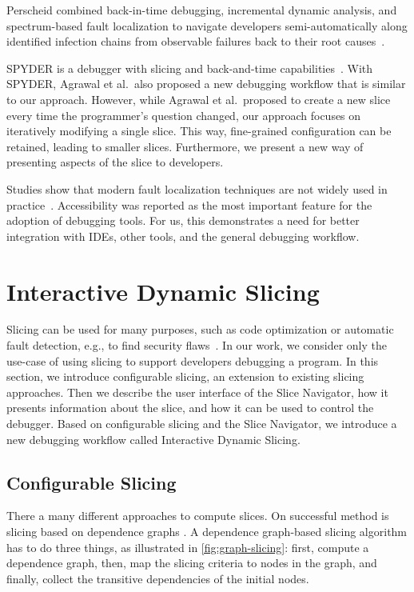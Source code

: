 \documentclass[
			english,
			]{elsarticle}
\begin{document}
Perscheid combined back-in-time debugging, incremental dynamic analysis, and spectrum-based fault localization to navigate developers semi-automatically along identified infection chains from observable failures back to their root causes~\cite{perscheid_testdriven_2013}.

SPYDER is a debugger with slicing and back-and-time capabilities~\cite{agrawal_debugging_1993}.
With SPYDER, Agrawal et al.\ also proposed a new debugging workflow that is similar to our approach.
However, while Agrawal et al.\ proposed to create a new slice every time the programmer's question changed, our approach focuses on iteratively modifying a single slice.
This way, fine-grained configuration can be retained, leading to smaller slices.
Furthermore, we present a new way of presenting aspects of the slice to developers.

Studies show that modern fault localization techniques are not widely used in practice~\cite{perscheid_studying_2017}.
Accessibility was reported as the most important feature for the adoption of debugging tools.
For us, this demonstrates a need for better integration with IDEs, other tools, and the general debugging workflow.

\section{Interactive Dynamic Slicing}
\label{sec:workflow}

Slicing can be used for many purposes, such as code optimization or automatic fault detection, e.g., to find security flaws~\cite{Ottenstein:1984:PDG:390011.808263, Backes:2016:RLA:2897845.2897927}.
In our work, we consider only the use-case of using slicing to support developers debugging a program.
In this section, we introduce configurable slicing, an extension to existing slicing approaches. 
Then we describe the user interface of the Slice Navigator, how it presents information about the slice, and how it can be used to control the debugger.
Based on configurable slicing and the Slice Navigator, we introduce a new debugging workflow called Interactive Dynamic Slicing.

\subsection{Configurable Slicing}

There a many different approaches to compute slices.
On successful method is slicing based on dependence graphs \cite{korel_dynamic_1998}.
A dependence graph-based slicing algorithm has to do three things, as illustrated in \cref{fig:graph-slicing}:
first, compute a dependence graph, then, map the slicing criteria to nodes in the graph, and finally, collect the transitive dependencies of the initial nodes.
\end{document}
